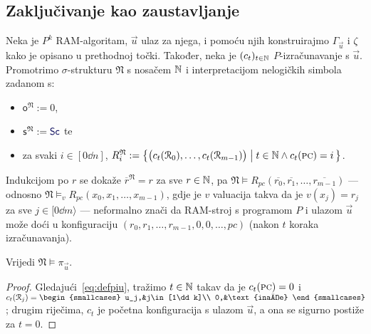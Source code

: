 \subsection{Zaključivanje kao zaustavljanje}

Neka je $P^k$ RAM-algoritam, $\vec u$ ulaz za njega, i pomoću njih konstruirajmo $\Gamma_{\vec u}$ i $\zeta$ kako je opisano u prethodnoj točki.
Također, neka je $(c_t)_{t\in{\mathbb N}}$ $P$-izračunavanje s $\vec u$. Promotrimo $\sigma$-strukturu $\mathfrak N$ s nosačem ${\mathbb N}$ i interpretacijom nelogičkih simbola zadanom s:
\begin{itemize}
	\item $\mathsf o^{\mathfrak N}:=0$,
	\item $\mathsf s^{\mathfrak N}:=\f{Sc}$ te
    \item za svaki $i\in[0\dd n]$,
    $
		R_i^{\mathfrak N}:=\bigl\{
        \bigl(c_t(\mathcal R_{0}),\dotsc,c_t(\mathcal R_{m-1})\bigr)
        \bigm|
        t\in{\mathbb N}\land c_t(\textsc{pc})=i
		\,\bigr\}
    $.
\end{itemize}
	Indukcijom po $r$ se dokaže $\overline r^{\mathfrak N}=r$ za sve $r\in{\mathbb N}$, pa $\mathfrak N\models R_{pc}(\overline{r_0},\overline{r_1},\dotsc,\overline{r_{m-1}})$ --- odnosno $\mathfrak N\models_v R_{pc}(x_0,x_1,\dotsc,x_{m-1})$, gdje je $v$ valuacija takva da je $v(x_j)=r_j$ za sve $j\in[0\dd m\rangle$ --- neformalno znači da RAM-stroj s programom $P$ i ulazom $\vec u$ može doći u konfiguraciju $(r_0,r_1,\dotsc,r_{m-1},0,0,\dotsc,pc)$ (nakon $t$ koraka izračunavanja).

\begin{lema}[{name=[istinitost početne formule u $\mathfrak N$]}]\label{lm:Npiu}
Vrijedi $\mathfrak N\models\pi_{\vec u}$.
\end{lema}
\begin{proof}
Gledajući~\eqref{eq:defpiu}, tražimo $t\in{\mathbb N}$ takav da je $c_t(\textsc{pc})=0$ i $c_t(\reg j)=\begin{smallcases}
u_j,&j\in[1\dd k]\\
0,&\text{inače}
\end{smallcases}\!$; drugim riječima, $c_t$ je početna konfiguracija s ulazom $\vec u$, a ona se sigurno postiže za $t=0$. %
\end{proof}

